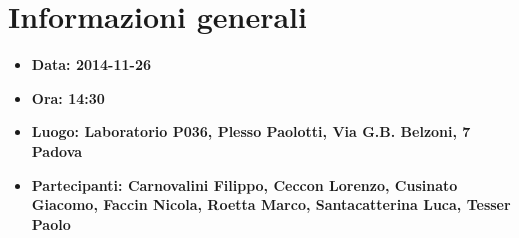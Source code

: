 %

\section{Informazioni generali}
\begin{itemize}
  \item \bfseries{Data:} \textnormal{2014-11-26}
  \item \bfseries{Ora:} \textnormal{14:30}
  \item \bfseries{Luogo:} \textnormal{Laboratorio P036, Plesso Paolotti, Via G.B. Belzoni, 7 Padova}
  \item \bfseries{Partecipanti:} \textnormal{Carnovalini Filippo, Ceccon Lorenzo, Cusinato Giacomo, Faccin Nicola, Roetta Marco, Santacatterina Luca, Tesser Paolo}
\end{itemize}


